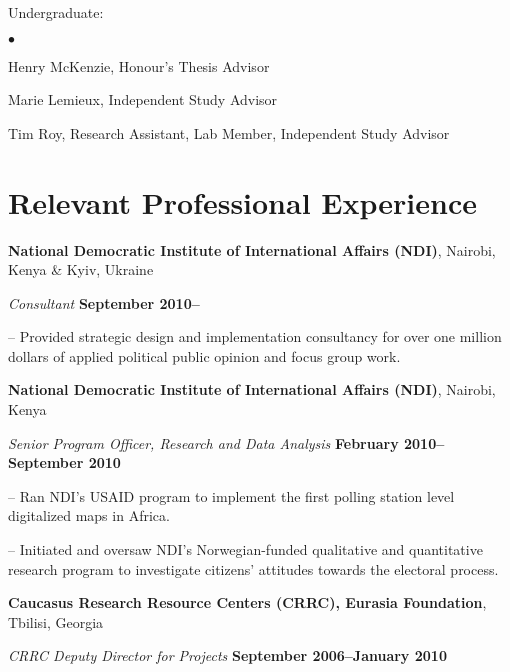 \documentclass[margin,line]{res}
\newenvironment{list1}{
  \begin{list}{\ding{113}}{%
      \setlength{\itemsep}{0in}
      \setlength{\parsep}{0in} \setlength{\parskip}{0in}
      \setlength{\topsep}{0in} \setlength{\partopsep}{0in} 
      \setlength{\leftmargin}{0.17in}}}{\end{list}}
\newenvironment{list2}{
  \begin{list}{$\bullet$}{%
      \setlength{\itemsep}{0in}
      \setlength{\parsep}{0in} \setlength{\parskip}{0in}
      \setlength{\topsep}{0in} \setlength{\partopsep}{0in} 
      \setlength{\leftmargin}{0.2in}}}{\end{list}}
\begin{document}
{\begin{resume}
\begin{list1}
 \item[] Undergraduate:
   \begin{list2}
   \item[] Henry McKenzie, Honour's Thesis Advisor
   \item[] Marie Lemieux, Independent Study Advisor
   \item[] Tim Roy, Research Assistant, Lab Member, Independent Study Advisor
\end{list2}
\end{list1}

\section{\sc Relevant Professional Experience}
{\bf National Democratic Institute of International Affairs (NDI)},
Nairobi, Kenya \& Kyiv, Ukraine

\vspace{-.3cm}
{\em Consultant} \hfill {\bf
  September 2010--}\\
\begin{list1}
\item[]-- Provided strategic design and implementation consultancy
  for over one million dollars of applied
political public opinion and focus group work.
\end{list1}

{\bf National Democratic Institute of International Affairs (NDI)}, Nairobi, Kenya
\vspace{-.3cm}

{\em Senior Program Officer, Research and Data Analysis} \hfill {\bf
  February 2010--September 2010}\\
\vspace{-.3cm}
\begin{list1} 
\item[]-- Ran NDI's  USAID program to implement the first polling station level
digitalized maps in Africa.
\item[]-- Initiated and oversaw NDI's
Norwegian-funded qualitative and quantitative research program to
investigate citizens' attitudes towards the electoral process.
\end{list1}
{\bf Caucasus Research Resource Centers (CRRC), Eurasia Foundation},
Tbilisi, Georgia

\vspace{-.3cm}
{\em CRRC Deputy Director for Projects} \hfill {\bf
  September 2006--January 2010}\\


\end{resume}}
\end{document}
